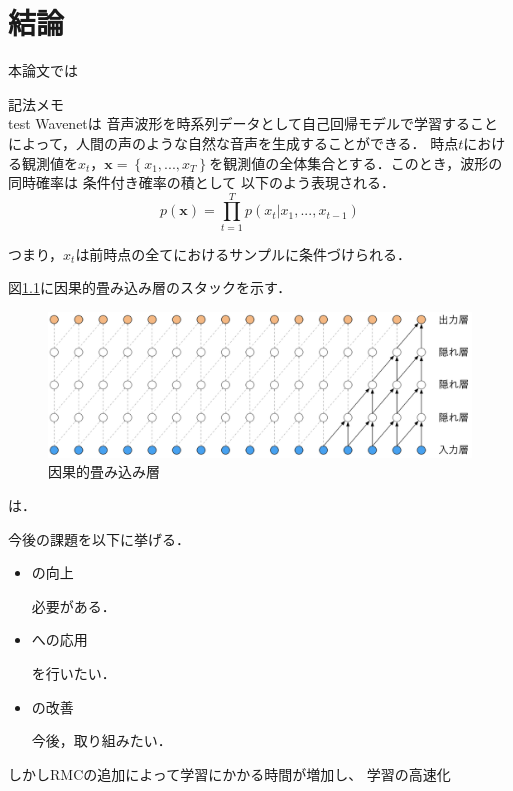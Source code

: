 \chapter{結論}
本論文では



記法メモ\\
test\cite{babi} \cite{memory_net} \cite{ntm} \cite{dnc} \cite{cslm} \cite{rrnn} \cite{simple_rel}
\cite{sam} \cite{gat} \cite{working2mem}
Wavenet\cite{oord2016wavenet}は
音声波形を時系列データとして自己回帰モデルで学習することによって，人間の声のような自然な音声を生成することができる．
時点$t$における観測値を$x_t$，$\bm{x} = \left\{ x_1, ..., x_T \right\}$を観測値の全体集合とする．このとき，波形の同時確率は 条件付き確率の積として
以下のよう表現される．
\begin{equation}
	p(\bm{x}) = \prod_{t=1}^T p(x_t | x_1, ..., x_{t-1})
\end{equation}

つまり，$x_t$は前時点の全てにおけるサンプルに条件づけられる．



図\ref{fig:ccl}に因果的畳み込み層のスタックを示す．

\begin{figure}[t]
	\centering
	\includegraphics[width=\linewidth]{./figure/ccl.png}
	\caption{因果的畳み込み層}
	\label{fig:ccl}
\end{figure}

\cite{juang1991hidden}は．

今後の課題を以下に挙げる．
\begin{itemize}
	\item の向上
	\par
	必要がある．
	\item への応用
	\par
	を行いたい．
	\newpage
	\item の改善
	\par
	今後，取り組みたい．
\end{itemize}

しかしRMCの追加によって学習にかかる時間が増加し、
学習の高速化

